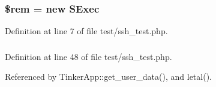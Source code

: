 \subsubsection{\setlength{\rightskip}{0pt plus 5cm}\$rem = new {\bf SExec}}\label{test_2ssh__test_8php_a1}




Definition at line 7 of file test/ssh\_\-test.php.
\subsubsection{}\label{test_2ssh__test_8php_a3}




Definition at line 48 of file test/ssh\_\-test.php.

Referenced by Tinker\-App::get\_\-user\_\-data(), and letal().